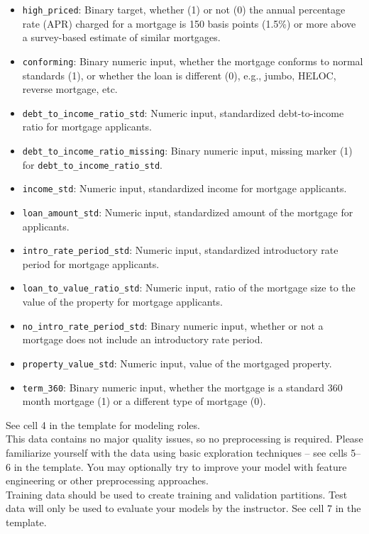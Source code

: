 \documentclass[fleqn]{article}
\begin{document}
\begin{itemize}\small
\item \texttt{high\_priced}: Binary target, whether (1) or not (0) the annual percentage rate (APR) charged for a mortgage is 150 basis points (1.5\%) or more above a survey-based estimate of similar mortgages.
\item \texttt{conforming}: Binary numeric input, whether the mortgage conforms to normal standards (1), or whether the loan is different (0), e.g., jumbo, HELOC, reverse mortgage, etc.
\item \texttt{debt\_to\_income\_ratio\_std}: Numeric input, standardized debt-to-income ratio for mortgage applicants. 
\item \texttt{debt\_to\_income\_ratio\_missing}: Binary numeric input, missing marker (1) for \texttt{debt\_to\_income\_ratio\_std}.
\item \texttt{income\_std}: Numeric input, standardized income for mortgage applicants. 
\item \texttt{loan\_amount\_std}: Numeric input, standardized amount of the mortgage for applicants. 
\item \texttt{intro\_rate\_period\_std}: Numeric input, standardized introductory rate period for mortgage applicants.
\item \texttt{loan\_to\_value\_ratio\_std}: Numeric input, ratio of the mortgage size to the value of the property for mortgage applicants. 
\item \texttt{no\_intro\_rate\_period\_std}: Binary numeric input, whether or not a mortgage does not include an introductory rate period.
\item \texttt{property\_value\_std}: Numeric input, value of the mortgaged property. 
\item \texttt{term\_360}: Binary numeric input, whether the mortgage is a standard 360 month mortgage (1) or a different type of mortgage (0).
\end{itemize}

\noindent See cell 4 in the template for modeling roles.\\

\noindent This data contains no major quality issues, so no preprocessing is required. Please familiarize yourself with the data using basic exploration techniques -- see cells 5--6 in the template. You may optionally try to improve your model with feature engineering or other preprocessing approaches.\\

\noindent Training data should be used to create training and validation partitions. Test data will only be used to evaluate your models by the instructor. See cell 7 in the template.
\end{document}
